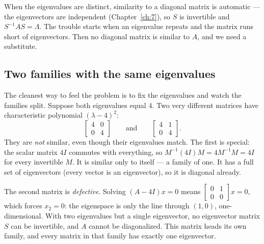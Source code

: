 When the eigenvalues are distinct, similarity to a diagonal matrix is automatic --- the eigenvectors are independent (Chapter~\ref{ch:7}), so $S$ is invertible and $S^{-1}AS=\Lambda$. The trouble starts when an eigenvalue repeats and the matrix runs short of eigenvectors. Then no diagonal matrix is similar to $A$, and we need a substitute.

\subsection{Two families with the same eigenvalues}

The cleanest way to feel the problem is to fix the eigenvalues and watch the families split. Suppose both eigenvalues equal $4$. Two very different matrices have characteristic polynomial $(\lambda-4)^2$:
\[
   \begin{bmatrix} 4 & 0\\ 0 & 4\end{bmatrix}
   \qquad\text{and}\qquad
   \begin{bmatrix} 4 & 1\\ 0 & 4\end{bmatrix}.
\]
They are \emph{not} similar, even though their eigenvalues match. The first is special: the scalar matrix $4I$ commutes with everything, so $M^{-1}(4I)M=4M^{-1}M=4I$ for every invertible $M$. It is similar only to itself --- a family of one. It has a full set of eigenvectors (every vector is an eigenvector), so it is diagonal already.

The second matrix is \emph{defective}. Solving $(A-4I)x=0$ means $\left[\begin{smallmatrix}0&1\\0&0\end{smallmatrix}\right]x=0$, which forces $x_2=0$: the eigenspace is only the line through $(1,0)$, one-dimensional. With two eigenvalues but a single eigenvector, no eigenvector matrix $S$ can be invertible, and $A$ cannot be diagonalized. This matrix heads its own family, and every matrix in that family has exactly one eigenvector.


